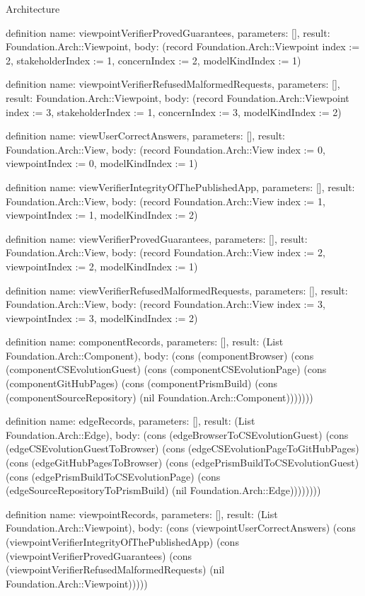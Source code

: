 \begin{lexlean}{Architecture}
\begin{semanticmodule}
definition{
  name: viewpointVerifierProvedGuarantees,
  parameters: [],
  result: Foundation.Arch::Viewpoint,
  body: (record Foundation.Arch::Viewpoint {index := 2, stakeholderIndex := 1, concernIndex := 2, modelKindIndex := 1})
}

definition{
  name: viewpointVerifierRefusedMalformedRequests,
  parameters: [],
  result: Foundation.Arch::Viewpoint,
  body: (record Foundation.Arch::Viewpoint {index := 3, stakeholderIndex := 1, concernIndex := 3, modelKindIndex := 2})
}

definition{
  name: viewUserCorrectAnswers,
  parameters: [],
  result: Foundation.Arch::View,
  body: (record Foundation.Arch::View {index := 0, viewpointIndex := 0, modelKindIndex := 1})
}

definition{
  name: viewVerifierIntegrityOfThePublishedApp,
  parameters: [],
  result: Foundation.Arch::View,
  body: (record Foundation.Arch::View {index := 1, viewpointIndex := 1, modelKindIndex := 2})
}

definition{
  name: viewVerifierProvedGuarantees,
  parameters: [],
  result: Foundation.Arch::View,
  body: (record Foundation.Arch::View {index := 2, viewpointIndex := 2, modelKindIndex := 1})
}

definition{
  name: viewVerifierRefusedMalformedRequests,
  parameters: [],
  result: Foundation.Arch::View,
  body: (record Foundation.Arch::View {index := 3, viewpointIndex := 3, modelKindIndex := 2})
}

definition{
  name: componentRecords,
  parameters: [],
  result: (List Foundation.Arch::Component),
  body: (cons (componentBrowser) (cons (componentCSEvolutionGuest) (cons (componentCSEvolutionPage) (cons (componentGitHubPages) (cons (componentPrismBuild) (cons (componentSourceRepository) (nil Foundation.Arch::Component)))))))
}

definition{
  name: edgeRecords,
  parameters: [],
  result: (List Foundation.Arch::Edge),
  body: (cons (edgeBrowserToCSEvolutionGuest) (cons (edgeCSEvolutionGuestToBrowser) (cons (edgeCSEvolutionPageToGitHubPages) (cons (edgeGitHubPagesToBrowser) (cons (edgePrismBuildToCSEvolutionGuest) (cons (edgePrismBuildToCSEvolutionPage) (cons (edgeSourceRepositoryToPrismBuild) (nil Foundation.Arch::Edge))))))))
}

definition{
  name: viewpointRecords,
  parameters: [],
  result: (List Foundation.Arch::Viewpoint),
  body: (cons (viewpointUserCorrectAnswers) (cons (viewpointVerifierIntegrityOfThePublishedApp) (cons (viewpointVerifierProvedGuarantees) (cons (viewpointVerifierRefusedMalformedRequests) (nil Foundation.Arch::Viewpoint)))))
}


\end{semanticmodule}
\end{lexlean}
